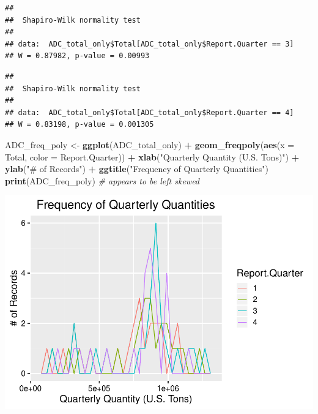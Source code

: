 \documentclass[12pt,]{article}
\newenvironment{Shaded}{\begin{snugshade}}{\end{snugshade}}
\newcommand{\KeywordTok}[1]{\textcolor[rgb]{0.13,0.29,0.53}{\textbf{#1}}}
\newcommand{\DataTypeTok}[1]{\textcolor[rgb]{0.13,0.29,0.53}{#1}}
\newcommand{\DecValTok}[1]{\textcolor[rgb]{0.00,0.00,0.81}{#1}}
\newcommand{\StringTok}[1]{\textcolor[rgb]{0.31,0.60,0.02}{#1}}
\newcommand{\CommentTok}[1]{\textcolor[rgb]{0.56,0.35,0.01}{\textit{#1}}}
\newcommand{\OperatorTok}[1]{\textcolor[rgb]{0.81,0.36,0.00}{\textbf{#1}}}
\newcommand{\NormalTok}[1]{#1}
\begin{document}
\begin{verbatim}
## 
##  Shapiro-Wilk normality test
## 
## data:  ADC_total_only$Total[ADC_total_only$Report.Quarter == 3]
## W = 0.87982, p-value = 0.00993
\end{verbatim}

\begin{Shaded}
\end{Shaded}

\begin{verbatim}
## 
##  Shapiro-Wilk normality test
## 
## data:  ADC_total_only$Total[ADC_total_only$Report.Quarter == 4]
## W = 0.83198, p-value = 0.001305
\end{verbatim}

\begin{Shaded}
\begin{Highlighting}[]
\NormalTok{ADC_freq_poly <-}\StringTok{ }\KeywordTok{ggplot}\NormalTok{(ADC_total_only) }\OperatorTok{+}
\StringTok{  }\KeywordTok{geom_freqpoly}\NormalTok{(}\KeywordTok{aes}\NormalTok{(}\DataTypeTok{x =}\NormalTok{ Total, }\DataTypeTok{color =}\NormalTok{ Report.Quarter)) }\OperatorTok{+}\StringTok{ }
\StringTok{  }\KeywordTok{xlab}\NormalTok{(}\StringTok{"Quarterly Quantity (U.S. Tons)"}\NormalTok{) }\OperatorTok{+}\StringTok{ }
\StringTok{  }\KeywordTok{ylab}\NormalTok{(}\StringTok{"# of Records"}\NormalTok{) }\OperatorTok{+}\StringTok{ }
\StringTok{  }\KeywordTok{ggtitle}\NormalTok{(}\StringTok{"Frequency of Quarterly Quantities"}\NormalTok{)}
\KeywordTok{print}\NormalTok{(ADC_freq_poly) }\CommentTok{# appears to be left skewed}
\end{Highlighting}
\end{Shaded}

\includegraphics{SKo_Project_Template_files/figure-latex/Test1-1.pdf}
\end{document}
